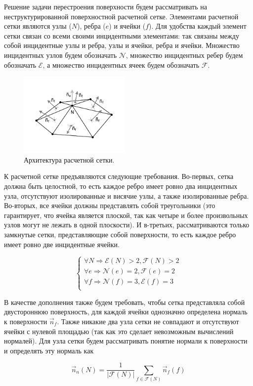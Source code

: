 Решение задачи перестроения поверхности будем рассматривать на неструктурированной поверхностной расчетной сетке.
Элементами расчетной сетки являются узлы ($N$), ребра ($e$)  и ячейки ($f$).
Для удобства каждый элемент сетки связан со всеми своими инцидентными элементами: так связаны между собой инцидентные узлы и ребра, узлы и ячейки, ребра и ячейки. Множество инцидентных узлов будем обозначать $\mathscr{N}$, множество инцидентных ребер будем обозначать $\mathscr{E}$, а множество инцидентных ячеек будем обозначать $\mathscr{F}$.

\begin{figure}[h]
\includegraphics[width=0.48\textwidth]{pics/pic_architecture_size.pdf}
\caption{Архитектура расчетной сетки.}\label{fig:pic_architecture}
\end{figure}

К расчетной сетке предъявляются следующие требования.
Во-первых, сетка должна быть целостной, то есть каждое ребро имеет ровно два инцидентных узла, отсутствуют изолированные и висячие узлы, а также изолированные ребра.
Во-вторых, все ячейки должны представлять собой треугольники (это гарантирует, что ячейка является плоской, так как четыре и более произвольных узлов могут не лежать в одной плоскости).
И в-третьих, рассматриваются только замкнутые сетки, представляющие собой поверхности, то есть каждое ребро имеет ровно две инцидентные ячейки.

\begin{equation}\label{eq_arch}
\begin{cases}
\forall N \Rightarrow \mathscr{E}(N) > 2, \mathscr{F}(N) > 2 \\
\forall e \Rightarrow \mathscr{N}(e) = 2 , \mathscr{F}(e) = 2 \\
\forall f \Rightarrow \mathscr{N}(f) = 3 , \mathscr{E}(f) = 3 \\
\end{cases}
\end{equation}

В качестве дополнения также будем требовать, чтобы сетка представляла собой двустороннюю поверхность, для каждой ячейки однозначно определена нормаль к поверхности $\vec{n}_f$.
Также никакие два узла сетки не совпадают и отсутствуют ячейки с нулевой площадью (так как это сделает невозможным вычислений нормалей).
Для узла сетки будем рассматривать понятие нормали к поверхности и определять эту нормаль как

\begin{equation}
\vec{n}_n(N) = \frac{1}{|\mathscr{F}(N)|} \sum_{f \in \mathscr{F}(N)}{\vec{n}_f(f)}
\end{equation}